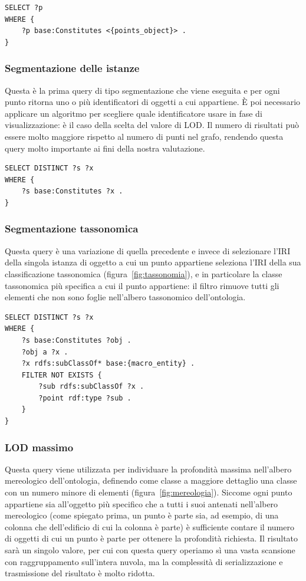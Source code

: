 \begin{lstlisting}[language=SPARQL]
SELECT ?p
WHERE {
    ?p base:Constitutes <{points_object}> .
}
\end{lstlisting}

\subsubsection{Segmentazione delle istanze}

Questa è la prima query di tipo segmentazione che viene eseguita e per ogni punto ritorna uno o più identificatori
di oggetti a cui appartiene. È poi necessario applicare un algoritmo per scegliere quale identificatore usare
in fase di visualizzazione: è il caso della scelta del valore di LOD. 
Il numero di risultati può essere molto maggiore rispetto al numero di punti nel grafo, rendendo questa query molto importante
ai fini della nostra valutazione.

\begin{lstlisting}[language=SPARQL]
SELECT DISTINCT ?s ?x
WHERE {
    ?s base:Constitutes ?x .
}
\end{lstlisting}

\subsubsection{Segmentazione tassonomica}

Questa query è una variazione di quella precedente e invece di selezionare l'IRI della singola istanza di oggetto a cui un punto
appartiene seleziona l'IRI della sua classificazione tassonomica (figura~\ref{fig:tassonomia}), e in particolare la classe
tassonomica più specifica a cui il punto appartiene: il filtro rimuove tutti gli elementi che non sono foglie
nell'albero tassonomico dell'ontologia.

\begin{lstlisting}[language=SPARQL]
SELECT DISTINCT ?s ?x
WHERE {
    ?s base:Constitutes ?obj .
    ?obj a ?x .
    ?x rdfs:subClassOf* base:{macro_entity} .
    FILTER NOT EXISTS {
        ?sub rdfs:subClassOf ?x .
        ?point rdf:type ?sub .
    }
}
\end{lstlisting}

\subsubsection{LOD massimo}

Questa query viene utilizzata per individuare la profondità massima nell'albero mereologico dell'ontologia, definendo come
classe a maggiore dettaglio una classe con un numero minore di elementi (figura~\ref{fig:mereologia}). Siccome ogni punto appartiene sia all'oggetto più specifico
che a tutti i suoi antenati nell'albero mereologico (come spiegato prima, un punto è parte sia, ad esempio, di una colonna
che dell'edificio di cui la colonna è parte) è sufficiente contare il numero di oggetti di cui un punto è parte per ottenere la
profondità richiesta. 
Il risultato sarà un singolo valore, per cui con questa query operiamo sì una vasta scansione con raggruppamento
sull'intera nuvola, ma la complessità di serializzazione e trasmissione del risultato è molto ridotta.

